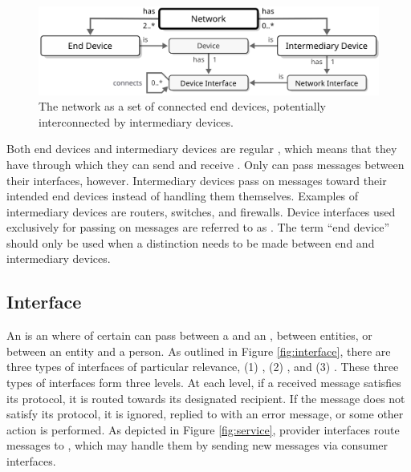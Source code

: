 \vfill

\begin{figure}[ht!]
  \centering
  \includegraphics[scale=0.9]{figures/network}
  \caption{
    The network as a set of connected end devices, potentially interconnected by intermediary devices.
  }
  \label{fig:network}
\end{figure}

Both end devices and intermediary devices are regular , which means that they have  through which they can send and receive .
Only  can pass messages between their interfaces, however.
Intermediary devices pass on messages toward their intended end devices instead of handling them themselves.
Examples of intermediary devices are routers, switches, and firewalls.
Device interfaces used exclusively for passing on messages are referred to as .
The term ``end device'' should only be used when a distinction needs to be made between end and intermediary devices.

\subsection{Interface}
\label{sec:concepts:interface}

An  is an   where  of certain  can pass between a  and an , between entities, or between an entity and a person.
As outlined in Figure \ref{fig:interface}, there are three types of interfaces of particular relevance, (1) , (2) , and (3) .
These three types of interfaces form three levels.
At each level, if a received message satisfies its protocol, it is routed towards its designated recipient.
If the message does not satisfy its protocol, it is ignored, replied to with an error message, or some other action is performed.
As depicted in Figure \ref{fig:service}, provider interfaces route messages to , which may handle them by sending new messages via consumer interfaces.

